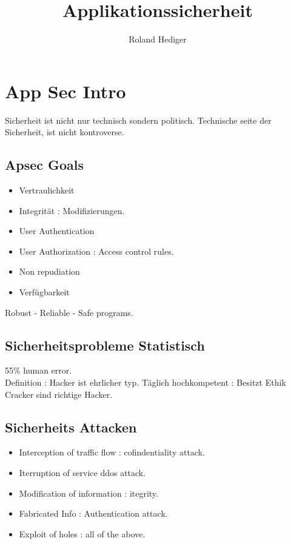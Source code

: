 \documentclass[a4paper,10pt]{scrreprt}
\begin{document}
\begin{titlepage}
\title{Applikationssicherheit}
\author{Roland Hediger}
\end{titlepage}
\maketitle
\newpage

\pagestyle{fancy}
\section{App Sec Intro}
Sicherheit ist nicht nur technisch sondern politisch. Technische seite der Sicherheit, ist nicht kontroverse.\\

\subsection{Apsec Goals}
\begin{itemize}
 \item Vertraulichkeit
 \item Integrität : Modifizierungen.
 \item User Authentication
 \item User Authorization : Access control rules. 
 \item Non repudiation
 \item Verfügbarkeit
\end{itemize}
Robust - Reliable - Safe programs.

\subsection{Sicherheitsprobleme Statistisch}
55\% human error. \\
Definition : Hacker ist ehrlicher typ. Täglich hochkompetent : Besitzt Ethik
Cracker sind richtige Hacker. \\

\subsection{Sicherheits Attacken}
\begin{itemize}
 \item Interception of traffic flow : cofindentiality attack.
 \item Iterruption of service ddos attack.
 \item Modification of information : itegrity.
 \item Fabricated Info : Authentication attack.
 \item Exploit of holes : all of the above.

\end{itemize}
\end{document}

